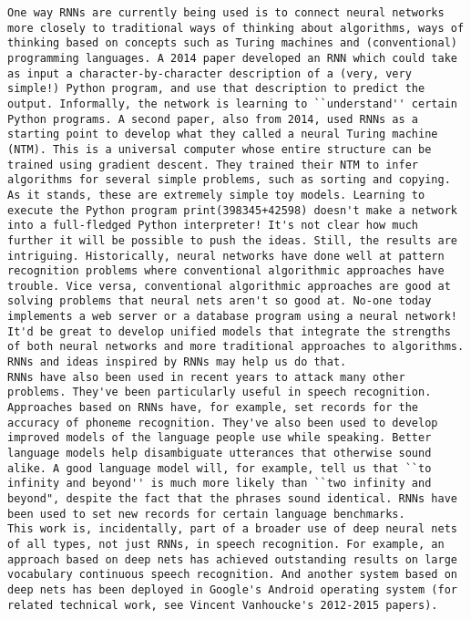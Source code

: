 \begin{lstlisting}
One way RNNs are currently being used is to connect neural networks more closely to traditional ways of thinking about algorithms, ways of thinking based on concepts such as Turing machines and (conventional) programming languages. A 2014 paper developed an RNN which could take as input a character-by-character description of a (very, very simple!) Python program, and use that description to predict the output. Informally, the network is learning to ``understand'' certain Python programs. A second paper, also from 2014, used RNNs as a starting point to develop what they called a neural Turing machine (NTM). This is a universal computer whose entire structure can be trained using gradient descent. They trained their NTM to infer algorithms for several simple problems, such as sorting and copying.
As it stands, these are extremely simple toy models. Learning to execute the Python program print(398345+42598) doesn't make a network into a full-fledged Python interpreter! It's not clear how much further it will be possible to push the ideas. Still, the results are intriguing. Historically, neural networks have done well at pattern recognition problems where conventional algorithmic approaches have trouble. Vice versa, conventional algorithmic approaches are good at solving problems that neural nets aren't so good at. No-one today implements a web server or a database program using a neural network! It'd be great to develop unified models that integrate the strengths of both neural networks and more traditional approaches to algorithms. RNNs and ideas inspired by RNNs may help us do that.
RNNs have also been used in recent years to attack many other problems. They've been particularly useful in speech recognition. Approaches based on RNNs have, for example, set records for the accuracy of phoneme recognition. They've also been used to develop improved models of the language people use while speaking. Better language models help disambiguate utterances that otherwise sound alike. A good language model will, for example, tell us that ``to infinity and beyond'' is much more likely than ``two infinity and beyond", despite the fact that the phrases sound identical. RNNs have been used to set new records for certain language benchmarks.
This work is, incidentally, part of a broader use of deep neural nets of all types, not just RNNs, in speech recognition. For example, an approach based on deep nets has achieved outstanding results on large vocabulary continuous speech recognition. And another system based on deep nets has been deployed in Google's Android operating system (for related technical work, see Vincent Vanhoucke's 2012-2015 papers).

\end{lstlisting}
